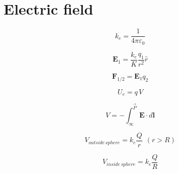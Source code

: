 \documentclass{form}
\author{Diogo Miguel Ferreira Rodrigues (dmfrodrigues2000@gmail.com)}
\begin{document}
\begin{minipage}[c]{0.25\textwidth}
	\section*{Electric field}
\end{minipage}
\begin{minipage}[c]{0.15\textwidth}
	\begin{equation*}
		k_e = \frac{1}{4\pi\varepsilon_0}
	\end{equation*}
\end{minipage}
\begin{minipage}[c]{0.15\textwidth}
	\begin{equation*}
		\mathbf{E}_1 = \frac{k_e}{K}\frac{q_1}{r^2}\hat{r}
	\end{equation*}
\end{minipage}
\begin{minipage}[c]{0.15\textwidth}
	\begin{equation*}
		\mathbf{F}_{1/2} = \mathbf{E}_1 q_2
	\end{equation*}
\end{minipage}
\begin{center}
\begin{minipage}[c]{0.10\textwidth}
	\begin{equation*}
		U_e=q\,V
	\end{equation*}
\end{minipage}
\begin{minipage}[c]{0.15\textwidth}
	\begin{equation*}
		V=-\int_{\infty}^{\vec{P}}{\mathbf{E}\cdot d\mathbf{l}}
	\end{equation*}
\end{minipage}
\begin{minipage}[c]{0.25\textwidth}
	\begin{equation*}
		V_{outside\,sphere} = k_e \frac{Q}{r}~~(r>R)
	\end{equation*}
\end{minipage}
\begin{minipage}[c]{0.20\textwidth}
	\begin{equation*}
		V_{inside\,sphere} = k_e \frac{Q}{R}
	\end{equation*}
\end{minipage}
\end{center}
\end{document}
